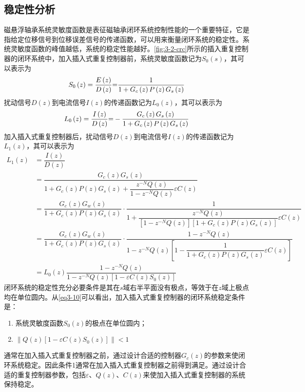\subsection{稳定性分析}
磁悬浮轴承系统灵敏度函数是表征磁轴承闭环系统控制性能的一个重要特征，它是指给定位移信号到位移误差信号的传递函数，可以用来衡量闭环系统的稳定性。系统灵敏度函数的峰值越低，系统的稳定性能越好。\autoref{fig:3-2-crc}所示的插入重复控制器的闭环系统中，加入插入式重复控制器前，系统灵敏度函数记为$S_0(s)$，其可以表示为
\begin{equation}
{S_0}\left( z \right) = {{E\left( z \right)} \over {D\left( z \right)}}{\rm{ = }}{1 \over {1 + {G_c}\left( z \right)P\left( z \right){G_s}\left( z \right)}}
\end{equation}
扰动信号$D(z)$到电流信号$I(z)$的传递函数记为$L_0(z)$，其可以表示为
\begin{equation}
{L_0}\left( z \right) = {{I\left( z \right)} \over {D\left( z \right)}}{\rm{ = }} - {{{G_c}\left( z \right){G_s}\left( z \right)} \over {1 + {G_c}\left( z \right)P\left( z \right){G_s}\left( z \right)}}
\end{equation}
加入插入式重复控制器后，扰动信号$D(z)$到电流信号$I(z)$的传递函数记为$L_1(z)$，其可以表示为
\begin{equation}
\label{eq3-10}
\begin{aligned}
L_1(z)
&=\dfrac{I(z)}{D(z)}\\
&=\dfrac{G_c(z)G_s(z)}{1+G_c(z)P(z)G_s(z)+\dfrac{z^{-N}Q(z)}{1-z^{-N}Q(z)}\varepsilon C(z)}\\
&=\dfrac{G_c(z)G_w(z)}{1+G_c(z)P(z)G_s(z)}\cdot \dfrac{1}{1+\dfrac{z^{-N}Q(z)}{[1-z^{-N}Q(z)][1+G_c(z)P(z)G_s(z)]}\varepsilon C(z)}\\
&=\dfrac{G_c(z)G_w(z)}{1+G_c(z)P(z)G_s(z)}\cdot \dfrac{1-z^{-N}Q(z)}{1-z^{-N}Q(z)\left[1-\dfrac{1}{1+G_c(z)P(z)G_s(z)}\varepsilon C(z)\right]}\\
&=L_0(z)\dfrac{1-z^{-N}Q(z)}{1-z^{-N}Q(z)[1-\varepsilon C(z)S_0(z)]}
\end{aligned}
\end{equation}
闭环系统的稳定性充分必要条件是其在$s$域右半平面没有极点，等效于在$z$域上极点均在单位圆内。从\autoref{eq3-10}可以看出，加入插入式重复控制器的闭环系统稳定条件是：
\begin{enumerate}
	\item 系统灵敏度函数$S_0(z)$的极点在单位圆内；
	\item $\left\| Q(z)[1 - \varepsilon C(z)S_0(z)] \right\| < 1$
\end{enumerate}
通常在加入插入式重复控制器之前，通过设计合适的控制器$G_c(z)$的参数来使闭环系统稳定。因此条件1通常在加入插入式重复控制器之前得到满足。通过设计合适的重复控制器参数，包括$\varepsilon$、$Q(z)$、$C(z)$来使加入插入式重复控制器的系统保持稳定。
